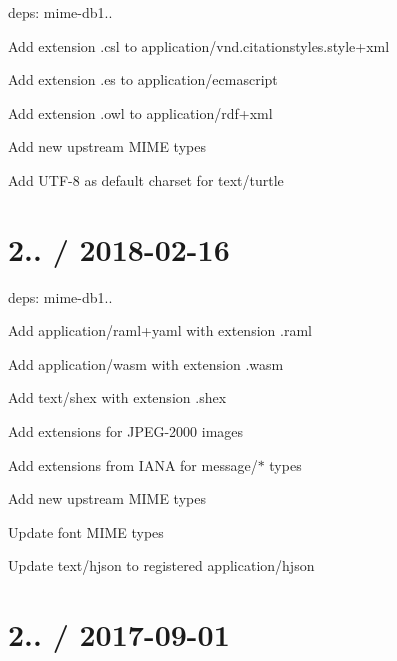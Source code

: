\begin{DoxyItemize}
\item deps\+: mime-\/db1..
\begin{DoxyItemize}
\item Add extension {\ttfamily .csl} to {\ttfamily application/vnd.\+citationstyles.\+style+xml}
\item Add extension {\ttfamily .es} to {\ttfamily application/ecmascript}
\item Add extension {\ttfamily .owl} to {\ttfamily application/rdf+xml}
\item Add new upstream M\+I\+ME types
\item Add U\+T\+F-\/8 as default charset for {\ttfamily text/turtle}
\end{DoxyItemize}
\end{DoxyItemize}

\section*{2.. / 2018-\/02-\/16 }


\begin{DoxyItemize}
\item deps\+: mime-\/db1..
\begin{DoxyItemize}
\item Add {\ttfamily application/raml+yaml} with extension {\ttfamily .raml}
\item Add {\ttfamily application/wasm} with extension {\ttfamily .wasm}
\item Add {\ttfamily text/shex} with extension {\ttfamily .shex}
\item Add extensions for J\+P\+E\+G-\/2000 images
\item Add extensions from I\+A\+NA for {\ttfamily message/$\ast$} types
\item Add new upstream M\+I\+ME types
\item Update font M\+I\+ME types
\item Update {\ttfamily text/hjson} to registered {\ttfamily application/hjson}
\end{DoxyItemize}
\end{DoxyItemize}

\section*{2.. / 2017-\/09-\/01 }


